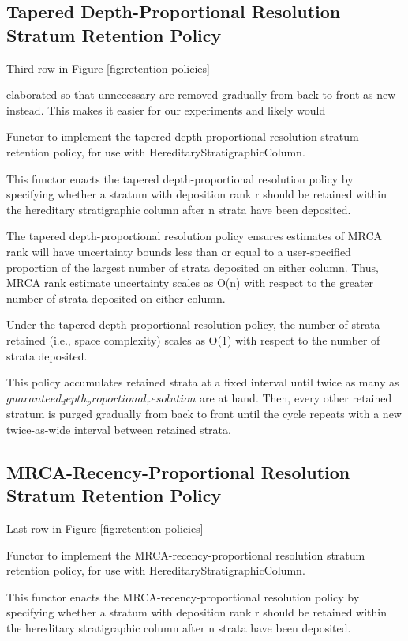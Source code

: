 \subsection{Tapered Depth-Proportional Resolution Stratum Retention Policy}

Third row in Figure \ref{fig:retention-policies}

elaborated so that unnecessary are removed gradually from back to front as new instead.
This makes it easier for our experiments and likely would

Functor to implement the tapered depth-proportional resolution stratum
retention policy, for use with HereditaryStratigraphicColumn.

This functor enacts the tapered depth-proportional resolution policy by
specifying whether a stratum with deposition rank r should be retained
within the hereditary stratigraphic column after n strata have been
deposited.

The tapered depth-proportional resolution policy ensures estimates of MRCA
rank will have uncertainty bounds less than or equal to a user-specified
proportion of the largest number of strata deposited on either column.
Thus, MRCA rank estimate uncertainty scales as O(n) with respect to the
greater number of strata deposited on either column.

Under the tapered depth-proportional resolution policy, the number of strata
retained (i.e., space complexity) scales as O(1) with respect to the number
of strata deposited.

This policy accumulates retained strata at a fixed interval until twice
as many as $guaranteed_depth_proportional_resolution$ are at hand. Then,
every other retained stratum is purged gradually from back to front
until the cycle repeats with a new twice-as-wide interval between
retained strata.

\subsection{MRCA-Recency-Proportional Resolution Stratum Retention Policy}

Last row in Figure \ref{fig:retention-policies}

Functor to implement the MRCA-recency-proportional resolution stratum
retention policy, for use with HereditaryStratigraphicColumn.

This functor enacts the MRCA-recency-proportional resolution policy by
specifying whether a stratum with deposition rank r should be retained
within the hereditary stratigraphic column after n strata have been
deposited.

